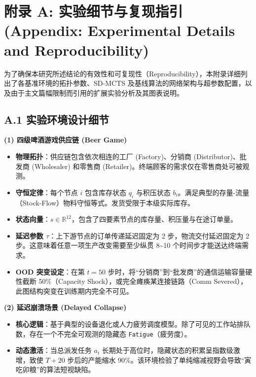 \documentclass[UTF8]{ctexart}
\begin{document}
\hypertarget{ux9644ux5f55-a-ux5b9eux9a8cux7ec6ux8282ux4e0eux590dux73b0ux6307ux5f15-appendix-experimental-details-and-reproducibility}{%
\section{附录 A: 实验细节与复现指引 (Appendix: Experimental Details and
Reproducibility)}\label{ux9644ux5f55-a-ux5b9eux9a8cux7ec6ux8282ux4e0eux590dux73b0ux6307ux5f15-appendix-experimental-details-and-reproducibility}}

为了确保本研究所述结论的有效性和可复现性（Reproducibility），本附录详细列出了各基准环境的拓扑参数、SD-MCTS
及基线算法的网络架构与超参数配置，以及由于主文篇幅限制而引用的扩展实验分析及其图表说明。

\hypertarget{a.1-ux5b9eux9a8cux73afux5883ux8bbeux8ba1ux7ec6ux8282}{%
\subsection{A.1
实验环境设计细节}\label{a.1-ux5b9eux9a8cux73afux5883ux8bbeux8ba1ux7ec6ux8282}}

\textbf{(1) 四级啤酒游戏供应链 (Beer Game)}

\begin{itemize}
\item \textbf{物理拓扑}：供应链包含依次相连的工厂 (Factory)、分销商 (Distributor)、批发商 (Wholesaler) 和零售商 (Retailer)。终端顾客的需求仅在零售商处可被观测。
\item \textbf{守恒定律}：每个节点 \(i\) 包含库存状态 \(q_i\) 与积压状态 \(b_i\)。满足典型的存量-流量（Stock-Flow）物料守恒等式。发货受限于本级实际库存。
\item \textbf{状态向量}：\(s \in \mathbb{R}^{12}\)，包含了四要素节点的库存量、积压量与在途订单量。
\item \textbf{延迟参数 \(\tau\)}：上下游节点的订单传递延迟固定为 2 步，物流交付延迟固定为 2 步。这意味着任意一项生产改变需要至少纵贯 8\textasciitilde{}10 个时间步才能送达终端需求。
\item \textbf{OOD 突变设定}：在第 \(t=50\) 步时，将``分销商''到``批发商''的通信运输容量硬性截断 50\%（Capacity Shock），或完全瘫痪某连接链路（Comm Severed），此图结构突变在训练期内完全不可见。
\end{itemize}

\textbf{(2) 延迟崩溃场景 (Delayed Collapse)}

\begin{itemize}
\item \textbf{核心逻辑}：基于典型的设备退化或人力疲劳调度模型。除了可见的工作站排队数，存在一个不完全可观测的隐藏态 \texttt{Fatigue}（疲劳度）。
\item \textbf{动态激活}：当总派发任务 \(a_t\) 长期处于高位时，隐藏状态的积累呈指数级激增，致使 \(T+20\) 步后的产能缩水 90\%。该环境检验了单纯缩减视野会导致``寅吃卯粮''的算法短视缺陷。
\end{itemize}
\end{document}
